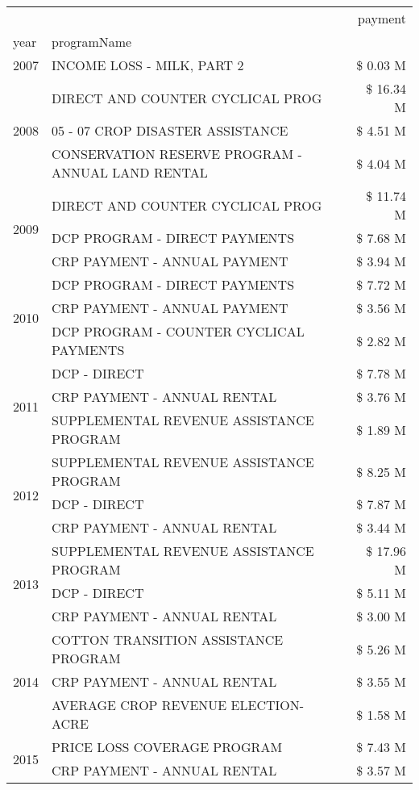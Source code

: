 \begin{tabular}{llr}
\toprule
 &  & payment \\
year & programName &  \\
\midrule
2007 & INCOME LOSS - MILK, PART 2 & \$ 0.03 M \\
\cline{1-3}
\multirow[t]{3}{*}{2008} & DIRECT AND COUNTER CYCLICAL PROG & \$ 16.34 M \\
 & 05 - 07 CROP DISASTER ASSISTANCE & \$ 4.51 M \\
 & CONSERVATION RESERVE PROGRAM - ANNUAL LAND RENTAL & \$ 4.04 M \\
\cline{1-3}
\multirow[t]{3}{*}{2009} & DIRECT AND COUNTER CYCLICAL PROG & \$ 11.74 M \\
 & DCP PROGRAM - DIRECT PAYMENTS & \$ 7.68 M \\
 & CRP PAYMENT - ANNUAL PAYMENT & \$ 3.94 M \\
\cline{1-3}
\multirow[t]{3}{*}{2010} & DCP PROGRAM - DIRECT PAYMENTS & \$ 7.72 M \\
 & CRP PAYMENT - ANNUAL PAYMENT & \$ 3.56 M \\
 & DCP PROGRAM - COUNTER CYCLICAL PAYMENTS & \$ 2.82 M \\
\cline{1-3}
\multirow[t]{3}{*}{2011} & DCP - DIRECT & \$ 7.78 M \\
 & CRP PAYMENT - ANNUAL RENTAL & \$ 3.76 M \\
 & SUPPLEMENTAL REVENUE ASSISTANCE PROGRAM & \$ 1.89 M \\
\cline{1-3}
\multirow[t]{3}{*}{2012} & SUPPLEMENTAL REVENUE ASSISTANCE PROGRAM & \$ 8.25 M \\
 & DCP - DIRECT & \$ 7.87 M \\
 & CRP PAYMENT - ANNUAL RENTAL & \$ 3.44 M \\
\cline{1-3}
\multirow[t]{3}{*}{2013} & SUPPLEMENTAL REVENUE ASSISTANCE PROGRAM & \$ 17.96 M \\
 & DCP - DIRECT & \$ 5.11 M \\
 & CRP PAYMENT - ANNUAL RENTAL & \$ 3.00 M \\
\cline{1-3}
\multirow[t]{3}{*}{2014} & COTTON TRANSITION ASSISTANCE PROGRAM & \$ 5.26 M \\
 & CRP PAYMENT - ANNUAL RENTAL & \$ 3.55 M \\
 & AVERAGE CROP REVENUE ELECTION-ACRE & \$ 1.58 M \\
\cline{1-3}
\multirow[t]{3}{*}{2015} & PRICE LOSS COVERAGE PROGRAM & \$ 7.43 M \\
 & CRP PAYMENT - ANNUAL RENTAL & \$ 3.57 M \\

\end{tabular}
